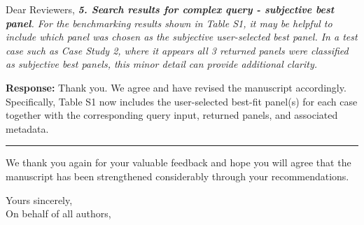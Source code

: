 \documentclass[12pt,a4paper]{letter}
\begin{document}
\begin{letter}{Dear Reviewers,}
\textit{\textbf{5. Search results for complex query - subjective best panel}.
For the benchmarking results shown in Table S1, it may be helpful to include which panel was chosen as the subjective user-selected best panel. In a test case such as Case Study 2, where it appears all 3 returned panels were classified as subjective best panels, this minor detail can provide additional clarity.}

\textbf{Response:} Thank you. We agree and have revised the manuscript accordingly. Specifically, Table S1 now includes the user-selected best-fit panel(s) for each case together with the corresponding query input, returned panels, and associated metadata.

\noindent\rule{\textwidth}{0.4pt}

We thank you again for your valuable feedback and hope you will agree that the manuscript has been strengthened considerably through your recommendations.

\closing{Yours sincerely,\\
On behalf of all authors,}

\end{letter}
\end{document}

